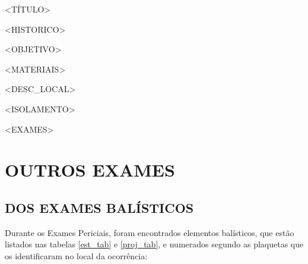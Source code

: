 \documentclass[a4paper,12pt,oneside]{article}
\newcounter{c}
\newcounter{d}
\newcounter{u}
\begin{document}
\tableofcontents
\setcounter{page}{2}
\newpage

\begin{centering}
<TÍTULO>

\end{centering}

<HISTORICO>

<OBJETIVO>

<MATERIAIS>

<DESC_LOCAL>

<ISOLAMENTO>

<EXAMES>


\section{OUTROS EXAMES}


\subsection{DOS EXAMES BALÍSTICOS \label{balistica}}

Durante os Exames Periciais, foram encontrados elementos balísticos, que estão listados nas tabelas \ref{est_tab} e \ref{proj_tab}, e numerados segundo as plaquetas que os identificaram no local da ocorrência:
\end{document}
